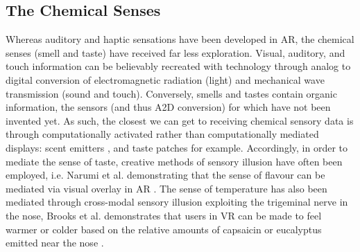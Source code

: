\subsection{The Chemical Senses}\label{sec: ar-sensory-chemical}
Whereas auditory and haptic sensations have been developed in AR, the chemical senses (smell and taste) have received far less exploration. Visual, auditory, and touch information can be believably recreated with technology through analog to digital conversion of electromagnetic radiation (light) and mechanical wave transmission (sound and touch). Conversely, smells and tastes contain organic information, the sensors (and thus A2D conversion) for which have not been invented yet. As such, the closest we can get to receiving chemical sensory data is through computationally activated rather than computationally mediated displays: scent emitters \citep{maggioni2019}, and taste patches for example. Accordingly, in order to mediate the sense of taste, creative methods of sensory illusion have often been employed, i.e. Narumi et al. demonstrating that the sense of flavour can be mediated via visual overlay in AR \citep{narumi2011}. The sense of temperature has also been mediated through cross-modal sensory illusion exploiting the trigeminal nerve in the nose, Brooks et al. demonstrates that users in VR can be made to feel warmer or colder based on the relative amounts of capsaicin or eucalyptus emitted near the nose \citeyearpar{brooks2020}.



